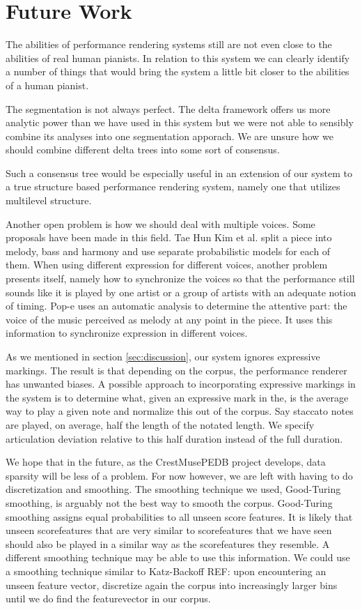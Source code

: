 \documentclass[a4paper,10pt]{article}
\begin{document}
\section{Future Work}
\label{sec:futurework}

The abilities of performance rendering systems still are not even close to the abilities of real human pianists. In relation to this system we can clearly identify a number of things that would bring the system a little bit closer to the abilities of a human pianist.

The segmentation is not always perfect. The delta framework offers us more analytic power than we have used in this system but we were not able to sensibly combine its analyses into one segmentation apporach. We are unsure how we should combine different delta trees into some sort of consensus.

Such a consensus tree would be especially useful in an extension of our system to a true structure based performance rendering system, namely one that utilizes multilevel structure.

Another open problem is how we should deal with multiple voices. Some proposals have been made in this field. Tae Hun Kim et al. \cite{kim2010performance} split a piece into melody, bass and harmony and use separate probabilistic models for each of them. When using different expression for different voices, another problem presents itself, namely how to synchronize the voices so that the performance still sounds like it is played by one artist or a group of artists with an adequate notion of timing. Pop-e \cite{hashida2006pop} uses an automatic analysis to determine the attentive part: the voice of the music perceived as melody at any point in the piece. It uses this information to synchronize expression in different voices.

As we mentioned in section \ref{sec:discussion}, our system ignores expressive markings. The result is that depending on the corpus, the performance renderer has unwanted biases. A possible approach to incorporating expressive markings in the system is to determine what, given an expressive mark in the, is the average way to play a given note and normalize this out of the corpus. Say staccato notes are played, on average, half the length of the notated length. We specify articulation deviation relative to this half duration instead of the full duration. 

We hope that in the future, as the CrestMusePEDB project develops, data sparsity will be less of a problem. For now however, we are left with having to do discretization and smoothing. The smoothing technique we used, Good-Turing smoothing, is arguably not the best way to smooth the corpus. Good-Turing smoothing assigns equal probabilities to all unseen score features. It is likely that unseen scorefeatures that are very similar to scorefeatures that we have seen should also be played in a similar way as the scorefeatures they resemble. A different smoothing technique may be able to use this information. We could use a smoothing technique similar to Katz-Backoff REF: upon encountering an unseen feature vector, discretize again the corpus into increasingly larger bins until we do find the featurevector in our corpus.
\end{document}
